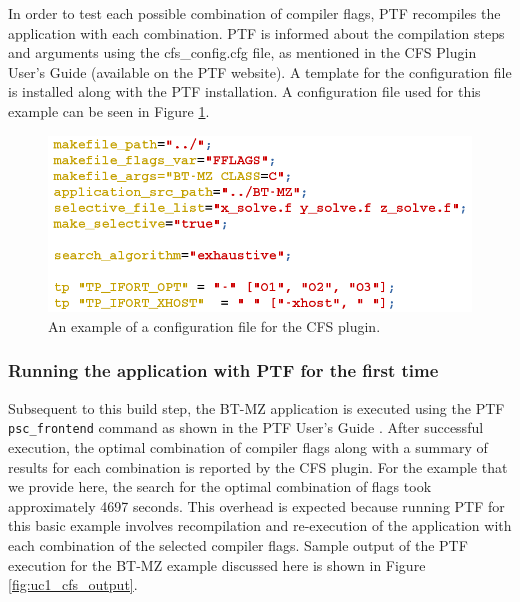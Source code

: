In order to test each possible combination of compiler flags, PTF recompiles the application with each combination. PTF is informed about the compilation steps and arguments using the cfs\_config.cfg file, as mentioned in the CFS Plugin User's Guide (available on the PTF website). A template for the configuration file is installed along with the PTF installation. A configuration file used for this example can be seen in Figure \ref{fig:uc1_cfs_config}.

\begin{figure}[H]
	\centering
	\includegraphics[scale=0.65]{../BPG/images/uc1_cfs_config.png}
	\caption{An example of a configuration file for the CFS plugin.}
	\label{fig:uc1_cfs_config}
\end{figure}


\subsubsection{Running the application with PTF for the first time}
Subsequent to this build step, the BT-MZ application is executed using the PTF {\tt psc\_frontend} command as shown in the PTF User's Guide \cite{PTFguide}. After successful execution, the optimal combination of compiler flags along with a summary of results for each combination is reported by the CFS plugin. For the example that we provide here, the search for the optimal combination of flags took approximately 4697 seconds. This overhead is expected because running PTF for this basic example involves recompilation and re-execution of the application with each combination of the selected compiler flags. Sample output of the PTF execution for the BT-MZ example discussed here is shown in Figure \ref{fig:uc1_cfs_output}.

